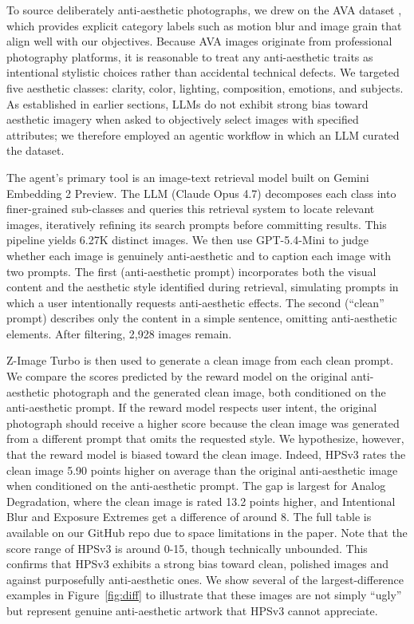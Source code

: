To source deliberately anti-aesthetic photographs, we drew on the AVA dataset \cite{murray_ava_2012}, which provides explicit category labels such as motion blur and image grain that align well with our objectives. Because AVA images originate from professional photography platforms, it is reasonable to treat any anti-aesthetic traits as intentional stylistic choices rather than accidental technical defects. We targeted five aesthetic classes: clarity, color, lighting, composition, emotions, and subjects. As established in earlier sections, LLMs do not exhibit strong bias toward aesthetic imagery when asked to objectively select images with specified attributes; we therefore employed an agentic workflow in which an LLM curated the dataset.

The agent's primary tool is an image-text retrieval model built on Gemini Embedding 2 Preview. The LLM (Claude Opus 4.7) decomposes each class into finer-grained sub-classes and queries this retrieval system to locate relevant images, iteratively refining its search prompts before committing results. This pipeline yields 6.27K distinct images. We then use GPT-5.4-Mini to judge whether each image is genuinely anti-aesthetic and to caption each image with two prompts. The first (anti-aesthetic prompt) incorporates both the visual content and the aesthetic style identified during retrieval, simulating prompts in which a user intentionally requests anti-aesthetic effects. The second (``clean'' prompt) describes only the content in a simple sentence, omitting anti-aesthetic elements. After filtering, 2,928 images remain.

Z-Image Turbo \cite{team_z-image_2025} is then used to generate a clean image from each clean prompt. We compare the scores predicted by the reward model on the original anti-aesthetic photograph and the generated clean image, both conditioned on the anti-aesthetic prompt. If the reward model respects user intent, the original photograph should receive a higher score because the clean image was generated from a different prompt that omits the requested style. We hypothesize, however, that the reward model is biased toward the clean image. Indeed, HPSv3 rates the clean image 5.90 points higher on average than the original anti-aesthetic image when conditioned on the anti-aesthetic prompt. The gap is largest for Analog Degradation, where the clean image is rated 13.2 points higher, and Intentional Blur and Exposure Extremes get a difference of around 8. The full table is available on our GitHub repo due to space limitations in the paper. Note that the score range of HPSv3 is around 0-15, though technically unbounded. This confirms that HPSv3 exhibits a strong bias toward clean, polished images and against purposefully anti-aesthetic ones. We show several of the largest-difference examples in Figure~\ref{fig:diff} to illustrate that these images are not simply ``ugly'' but represent genuine anti-aesthetic artwork that HPSv3 cannot appreciate. 

